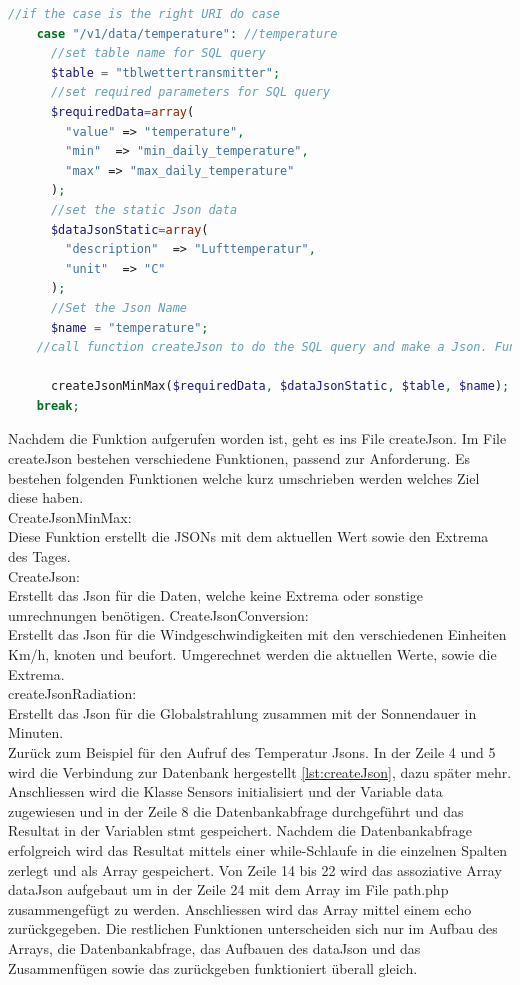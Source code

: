 \begin{lstlisting}[label=lst:path,caption=Beispiel Case zuweisung, language=php, style=php]
  //if the case is the right URI do case
    case "/v1/data/temperature": //temperature
      //set table name for SQL query
      $table = "tblwettertransmitter";
      //set required parameters for SQL query
      $requiredData=array(
        "value" => "temperature",
        "min"  => "min_daily_temperature",
        "max" => "max_daily_temperature"
      );
      //set the static Json data
      $dataJsonStatic=array(
        "description"  => "Lufttemperatur",
        "unit"  => "C"
      );
      //Set the Json Name
      $name = "temperature";
    //call function createJson to do the SQL query and make a Json. Function is in file createJson.php

      createJsonMinMax($requiredData, $dataJsonStatic, $table, $name);
    break;
\end{lstlisting}

Nachdem die Funktion aufgerufen worden ist, geht es ins File createJson. Im File createJson bestehen verschiedene Funktionen, passend zur Anforderung. Es bestehen folgenden Funktionen welche kurz umschrieben werden welches Ziel diese haben.\\

CreateJsonMinMax:\\
Diese Funktion erstellt die JSONs mit dem aktuellen Wert sowie den Extrema des Tages.\\
CreateJson:\\
Erstellt das Json für die Daten, welche keine Extrema oder sonstige umrechnungen benötigen.
CreateJsonConversion:\\
Erstellt das Json für die Windgeschwindigkeiten mit den verschiedenen Einheiten Km/h, knoten und beufort. Umgerechnet werden die aktuellen Werte, sowie die Extrema.\\
createJsonRadiation:\\
Erstellt das Json für die Globalstrahlung zusammen mit der Sonnendauer in Minuten.\\

Zurück zum Beispiel für den Aufruf des Temperatur Jsons. In der Zeile 4 und 5 wird die Verbindung zur Datenbank hergestellt \ref{lst:createJson}, dazu später mehr. Anschliessen wird die Klasse Sensors initialisiert und der Variable data zugewiesen und in der Zeile 8 die Datenbankabfrage durchgeführt und das Resultat in der Variablen stmt gespeichert. Nachdem die Datenbankabfrage erfolgreich wird das Resultat mittels einer while-Schlaufe in die einzelnen Spalten zerlegt und als Array gespeichert. Von Zeile 14 bis 22 wird das assoziative Array dataJson aufgebaut um in der Zeile 24 mit dem Array im File path.php zusammengefügt zu werden. Anschliessen wird das Array mittel einem echo zurückgegeben. Die restlichen Funktionen unterscheiden sich nur im Aufbau des Arrays, die Datenbankabfrage, das Aufbauen des dataJson und das Zusammenfügen sowie das zurückgeben funktioniert überall gleich.

